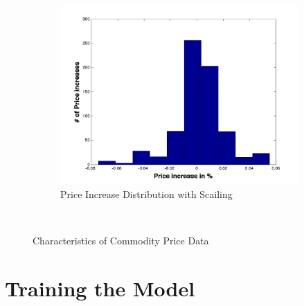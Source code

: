 \begin{figure}[ht]
\begin{subfigure}[b]{0.5\textwidth}
                \includegraphics[width=\textwidth]{img/model/p_increase_w}
                \caption{Price Increase Distribution with Scailing}
                \label{fig:u_log}
        \end{subfigure}
        ~ %

      
        \caption{Characteristics of Commodity Price Data}\label{fig:distribution_smoothing}
\end{figure}





\section{Training the Model}

